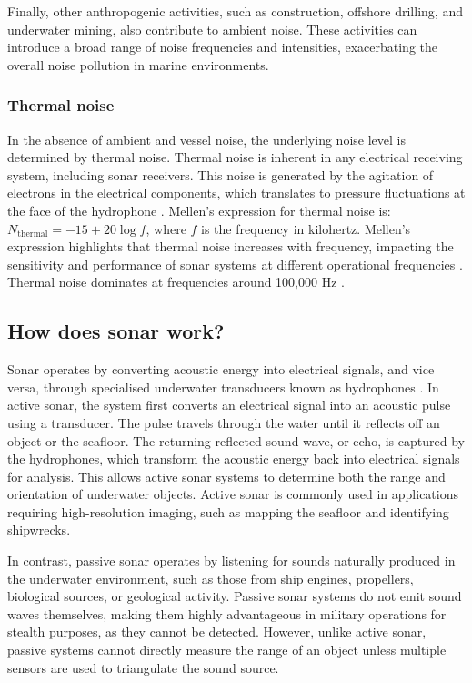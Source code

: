 Finally, other anthropogenic activities, such as construction, offshore drilling, and underwater mining, also contribute to ambient noise. These activities can introduce a broad range of noise frequencies and intensities, exacerbating the overall noise pollution in marine environments. 

\subsubsection{Thermal noise}
    In the absence of ambient and vessel noise, the underlying noise level is determined by thermal noise. Thermal noise is inherent in any electrical receiving system, including sonar receivers. This noise is generated by the agitation of electrons in the electrical components, which translates to pressure fluctuations at the face of the hydrophone \cite{waite_sonar_2002}. Mellen's expression for thermal noise is: $N_\text{thermal} = -15 + 20 \log f$, where $f$ is the frequency in kilohertz. Mellen's expression highlights that thermal noise increases with frequency, impacting the sensitivity and performance of sonar systems at different operational frequencies \cite{bjorno_applied_2017}. Thermal noise dominates at frequencies around 100,000 Hz \cite{dahl_underwater_2007}.

\subsection{How does sonar work?}\label{subsec:sonar-working}

Sonar operates by converting acoustic energy into electrical signals, and vice versa, through specialised underwater transducers known as hydrophones \cite{waite_sonar_2002, rodriguez_fundamentals_2023, abraham_underwater_2019}. In active sonar, the system first converts an electrical signal into an acoustic pulse using a transducer. The pulse travels through the water until it reflects off an object or the seafloor. The returning reflected sound wave, or echo, is captured by the hydrophones, which transform the acoustic energy back into electrical signals for analysis. This allows active sonar systems to determine both the range and orientation of underwater objects. Active sonar is commonly used in applications requiring high-resolution imaging, such as mapping the seafloor and identifying shipwrecks.

In contrast, passive sonar operates by listening for sounds naturally produced in the underwater environment, such as those from ship engines, propellers, biological sources, or geological activity. Passive sonar systems do not emit sound waves themselves, making them highly advantageous in military operations for stealth purposes, as they cannot be detected. However, unlike active sonar, passive systems cannot directly measure the range of an object unless multiple sensors are used to triangulate the sound source.

